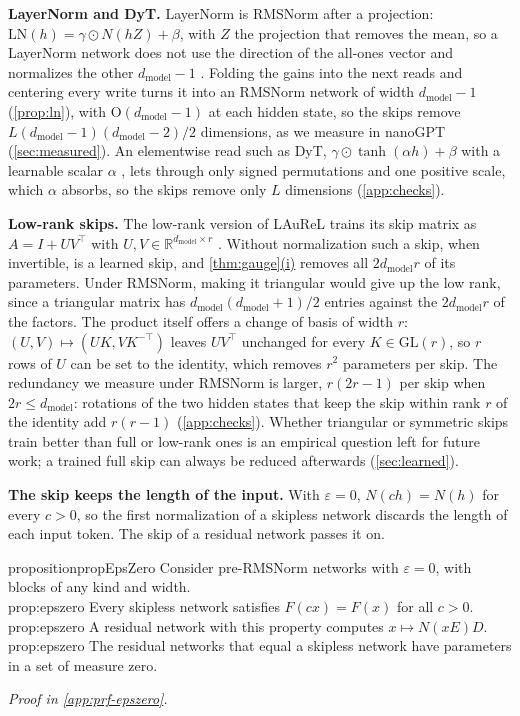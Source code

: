 \documentclass[10pt]{article}
\theoremstyle{definition}
\theoremstyle{remark}
\newcommand{\R}{\mathbb{R}}
\newcommand{\dm}{d_{\mathrm{model}}}
\newcommand{\GL}{\mathrm{GL}}
\newcommand{\Ort}{\mathrm{O}}
\newcommand{\para}[1]{\smallskip\noindent\textbf{#1}\hspace{0.5em}}
\newcommand{\ptlabel}[1]{\phantomsection\label{#1}}
\DeclareRobustCommand{\cpref}[2]{\hyperref[#1:#2]{\cref*{#1}(#2)}}
\newcommand{\proofin}[1]{\par\vspace{-0.4\baselineskip}\noindent\hfill{\small\itshape Proof in \cref{#1}.}\par\smallskip}
\newcommand{\stpart}[3]{\ifx\relax#1\relax\else\ptlabel{#1:#2}\fi{\upshape\bfseries\boldmath(#2)\ifx\relax#3\relax\else\ #3.\fi}}
\begin{document}
\para{LayerNorm and DyT.} LayerNorm is RMSNorm after a projection: $\mathrm{LN}(h) = \gamma \odot N(hZ) + \beta$, with $Z$ the projection that removes the mean, so a LayerNorm network does not use the direction of the all-ones vector and normalizes the other $\dm - 1$ \citep{ashkboos2024slicegpt,theus2025glmc,baroni2026lnfree}. Folding the gains into the next reads and centering every write turns it into an RMSNorm network of width $\dm - 1$ (\cref{prop:ln}), with $\Ort(\dm-1)$ at each hidden state, so the skips remove $L(\dm-1)(\dm-2)/2$ dimensions, as we measure in nanoGPT (\cref{sec:measured}). An elementwise read such as DyT, $\gamma \odot \tanh(\alpha h) + \beta$ with a learnable scalar $\alpha$ \citep{zhu2025dyt}, lets through only signed permutations and one positive scale, which $\alpha$ absorbs, so the skips remove only $L$ dimensions (\cref{app:checks}).


\para{Low-rank skips.} The low-rank version of LAuReL trains its skip matrix as $A = I + UV^\top$ with $U, V \in \R^{\dm\times r}$ \citep{menghani2024laurel}. Without normalization such a skip, when invertible, is a learned skip, and \cpref{thm:gauge}{i} removes all $2\dm r$ of its parameters. Under RMSNorm, making it triangular would give up the low rank, since a triangular matrix has $\dm(\dm+1)/2$ entries against the $2\dm r$ of the factors. The product itself offers a change of basis of width $r$: $(U, V) \mapsto (UK, VK^{-\top})$ leaves $UV^\top$ unchanged for every $K \in \GL(r)$, so $r$ rows of $U$ can be set to the identity, which removes $r^2$ parameters per skip. The redundancy we measure under RMSNorm is larger, $r(2r-1)$ per skip when $2r \le \dm$: rotations of the two hidden states that keep the skip within rank $r$ of the identity add $r(r-1)$ (\cref{app:checks}). Whether triangular or symmetric skips train better than full or low-rank ones is an empirical question left for future work; a trained full skip can always be reduced afterwards (\cref{sec:learned}).

\para{The skip keeps the length of the input.} With $\varepsilon = 0$, $N(ch) = N(h)$ for every $c > 0$, so the first normalization of a skipless network discards the length of each input token. The skip of a residual network passes it on.

\begin{restatable}[Absorption under RMSNorm with $\varepsilon = 0$]{proposition}{propEpsZero}\label{prop:epszero}
Consider pre-RMSNorm networks with $\varepsilon = 0$, with blocks of any kind and width.\\
\stpart{prop:epszero}{i}{} Every skipless network satisfies $F(cx) = F(x)$ for all $c > 0$.\\
\stpart{prop:epszero}{ii}{} A residual network with this property computes $x \mapsto N(xE)D$.\\
\stpart{prop:epszero}{iii}{} The residual networks that equal a skipless network have parameters in a set of measure zero.
\end{restatable}
\proofin{app:prf-epszero}
\end{document}
